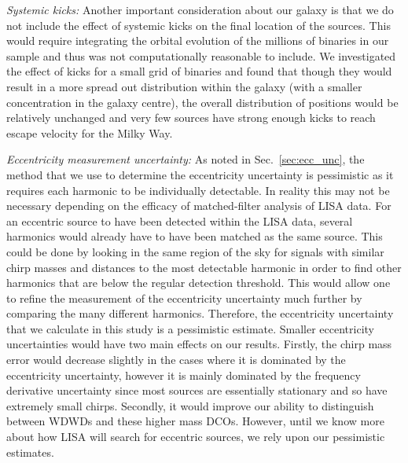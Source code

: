 \textit{Systemic kicks:} Another important consideration about our galaxy is that we do not include the effect of systemic kicks on the final location of the sources. This would require integrating the orbital evolution of the millions of binaries in our sample and thus was not computationally reasonable to include. We investigated the effect of kicks for a small grid of binaries and found that though they would result in a more spread out distribution within the galaxy (with a smaller concentration in the galaxy centre), the overall distribution of positions would be relatively unchanged and very few sources have strong enough kicks to reach escape velocity for the Milky Way.

\textit{Eccentricity measurement uncertainty:} As noted in Sec.~\ref{sec:ecc_unc}, the method that we use to determine the eccentricity uncertainty is pessimistic as it requires each harmonic to be individually detectable. In reality this may not be necessary depending on the efficacy of matched-filter analysis of LISA data. For an eccentric source to have been detected within the LISA data, several harmonics would already have to have been matched as the same source. This could be done by looking in the same region of the sky for signals with similar chirp masses and distances to the most detectable harmonic in order to find other harmonics that are below the regular detection threshold. This would allow one to refine the measurement of the eccentricity uncertainty much further by comparing the many different harmonics. Therefore, the eccentricity uncertainty that we calculate in this study is a pessimistic estimate. Smaller eccentricity uncertainties would have two main effects on our results. Firstly, the chirp mass error would decrease slightly in the cases where it is dominated by the eccentricity uncertainty, however it is mainly dominated by the frequency derivative uncertainty since most sources are essentially stationary and so have extremely small chirps. Secondly, it would improve our ability to distinguish between WDWDs and these higher mass DCOs. However, until we know more about how LISA will search for eccentric sources, we rely upon our pessimistic estimates.